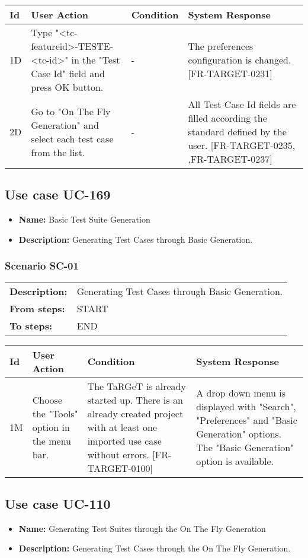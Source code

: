 \documentclass[a4paper,11pt]{article}
\newcommand{\bl}{\\ \hline}
\begin{document}
\begin{tabular}{|p{0.8in}|p{1.6in}|p{1.6in}|p{1.6in}|}
\hline
Id & User Action & Condition & System Response  \bl 
1D & Type "<tc-featureid>-TESTE-<tc-id>" in the "Test Case Id" field and press OK button. & - & The preferences configuration is changed. [FR-TARGET-0231] \bl 
2D & Go to "On The Fly Generation" and select each test case from the list. & - & All Test Case Id fields are filled according the standard defined by the user. [FR-TARGET-0235, ,FR-TARGET-0237] \bl 
\end{tabular}
\subsection*{Use case UC-169}
\begin{itemize}
\item {\bf Name: }Basic Test Suite Generation 
\item {\bf Description: }Generating Test Cases through Basic Generation.
	  
\end{itemize}
\subsubsection*{Scenario SC-01}
\begin{tabular}{p{1in}p{4in}}
{\bf Description:} & Generating Test Cases through Basic Generation.
	     \\
{\bf From steps:} & START \\
{\bf To steps:} & END \\
\end{tabular}
 
\begin{tabular}{|p{0.8in}|p{1.6in}|p{1.6in}|p{1.6in}|}
\hline
Id & User Action & Condition & System Response  \bl 
1M & Choose the "Tools" option in the menu bar.  & The TaRGeT is already started up. There is an already
		created project with at least one imported use case without
		errors. [FR-TARGET-0100] & A drop down menu is displayed with "Search",
		"Preferences" and "Basic Generation" options. The "Basic
		Generation" option is available.  \bl 
\end{tabular}
\subsection*{Use case UC-110}
\begin{itemize}
\item {\bf Name: }Generating Test Suites through the On The Fly Generation
\item {\bf Description: }Generating Test Cases through the On The Fly Generation.
\end{itemize}
\end{document}
